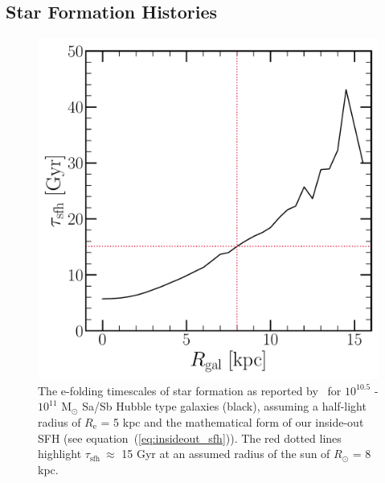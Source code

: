 \documentclass[a4paper, fleqn, usenatbib, useAMS]{mnras}
\newcommand{\refp}[1]{(\ref{#1})}
\begin{document}
\subsection{Star Formation Histories} 
\label{sec:methods:sfhs} 

\begin{figure} 
\centering 
\includegraphics[scale = 0.45]{tau_sfh.pdf} 
\caption{The e-folding timescales of star formation as reported 
by~\citet{Sanchez2020} for $10^{10.5}$ - $10^{11}$ M$_\odot$ Sa/Sb Hubble type 
galaxies (black), assuming a half-light radius of $R_\text{e}$ = 5 kpc and the 
mathematical form of our inside-out SFH (see equation~\refp{eq:insideout_sfh}). 
The red dotted lines highlight $\tau_\text{sfh}~\approx$ 15 Gyr at an assumed 
radius of the sun of $R_\odot$ = 8 kpc. }
\label{fig:tau_sfh}
\end{figure} 
\end{document}
